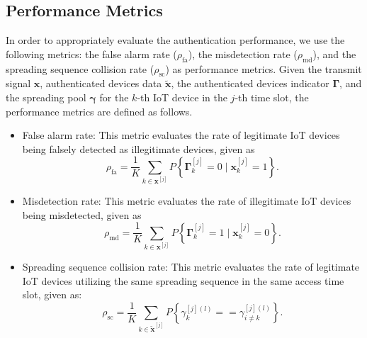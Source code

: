 \documentclass[journal,10pt]{IEEEtran}
\begin{document}
\subsection{Performance Metrics}
In order to appropriately evaluate the authentication performance, we use the following metrics: the false alarm rate ($\rho_{\mathrm{fa}}$), the misdetection rate ($\rho_{\mathrm{md}}$), and the spreading sequence collision rate ($\rho_{\mathrm{sc}}$) as performance metrics. Given the transmit signal $\mathbf{x}$, authenticated devices data $\tilde{\mathbf{x}}$, the authenticated devices indicator $\mathbf{\Gamma}$, and the spreading pool $\mathbf{\gamma}$ for the $k$-th IoT device in the $j$-th time slot, the performance metrics are defined as follows.
\begin{itemize}
    \item False alarm rate: This metric evaluates the rate of legitimate IoT devices being falsely detected as illegitimate devices, given as
    \begin{equation}
        \rho_{\mathrm{fa}} =  \frac{1}{K} \displaystyle\sum_{k \in \mathbf{x}^{[j]}} P \left\{  \mathbf{\Gamma}_k^{[j]} = 0 \; | \; \mathbf{x}_k^{[j]} = 1   \right\}.
    \end{equation}
    
    \item Misdetection rate: This metric evaluates the rate of illegitimate IoT devices being misdetected, given as
    \begin{equation}
        \rho_{\mathrm{md}} =  \frac{1}{K} \displaystyle\sum_{k \in \mathbf{x}^{[j]}} P \left\{  \mathbf{\Gamma}_k^{[j]} = 1 \; | \; \mathbf{x}_k^{[j]} = 0   \right\}.
    \end{equation}
    
    \item Spreading sequence collision rate: This metric evaluates the rate of legitimate IoT devices utilizing the same spreading sequence in the same access time slot, given as:
    \begin{equation}
        \rho_{\mathrm{sc}} =  \frac{1}{K} \displaystyle\sum_{k \in \tilde{\mathbf{x}}^{[j]} } P \left\{  \gamma_k^{[j](l)} == \gamma_{i \neq k}^{[j](l)}  \right\}.
    \end{equation}
\end{itemize}
\end{document}
